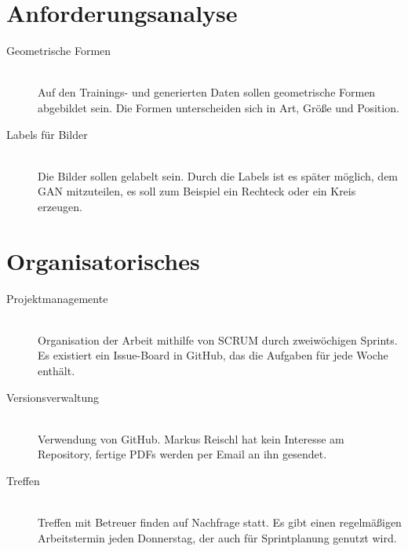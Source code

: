 
\newcommand{\Titel}{0. Protokoll - Vorbesprechung}
\newcommand{\Teilnehmer}{Jonas Bürgel, Patrick Welter, Markus Reischl}
\newcommand{\DatumUndZeit}{15.09.2021 14:00-14:30}
\newcommand{\Ort}{Zoom Meeting}
\newcommand{\Thema}{Projekt aufsetzen und Thema einreichen}


\section{Anforderungsanalyse}
\begin{description}
	\item[Geometrische Formen] \hfill \\
	Auf den Trainings- und generierten Daten sollen geometrische Formen abgebildet sein. Die Formen unterscheiden sich in Art, Größe und Position.
	
	\item[Labels für Bilder] \hfill \\
	Die Bilder sollen gelabelt sein. Durch die Labels ist es später möglich, dem GAN mitzuteilen, es soll zum Beispiel ein Rechteck oder ein Kreis erzeugen.
\end{description}

\section{Organisatorisches}
\begin{description}
	\item[Projektmanagemente] \hfill \\
	Organisation der Arbeit mithilfe von SCRUM durch zweiwöchigen Sprints. Es existiert ein Issue-Board in GitHub, das die Aufgaben für jede Woche enthält.
	
	\item[Versionsverwaltung] \hfill \\
	Verwendung von GitHub. Markus Reischl hat kein Interesse am Repository, fertige PDFs werden per Email an ihn gesendet.
	
	\item[Treffen] \hfill \\
	Treffen mit Betreuer finden auf Nachfrage statt. Es gibt einen regelmäßigen Arbeitstermin jeden Donnerstag, der auch für Sprintplanung genutzt wird.
\end{description}

